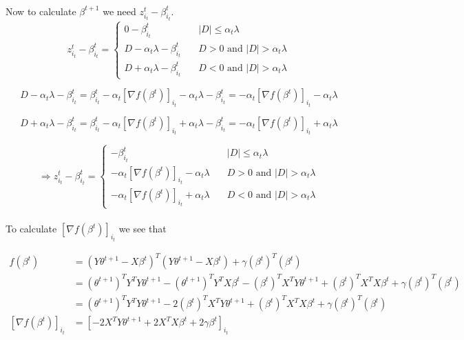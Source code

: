 \documentclass[12pt, reqno]{amsart}
\theoremstyle{definition}
\theoremstyle{remark}
\begin{document}
\hfill \\
Now to calculate $\beta^{t+1}$ we need $z_{i_t}^t - \beta_{i_t}^t$.\\

\begin{equation*}
z_{i_t}^t - \beta_{i_t}^t = \left\{
			\begin{array}{ll}
				0 - \beta_{i_t}^t  & \quad |D| \leq \alpha_t \lambda \\
				D - \alpha_t \lambda - \beta_{i_t}^t & \quad D > 0 
				\text{ and } |D| > \alpha_t \lambda \\
				D + \alpha_t \lambda - \beta_{i_t}^t & \quad D < 0 
				\text{ and } |D| > \alpha_t \lambda
			\end{array}
			\right.
\end{equation*}

\begin{equation*}
D - \alpha_t \lambda - \beta_{i_t}^t = \beta_{i_t}^t - \alpha_t [\nabla f(\beta^t)]_{i_t} - \alpha_t \lambda - \beta_{i_t}^t = -\alpha_t [\nabla f(\beta^t)]_{i_t} - \alpha_t \lambda
\end{equation*}

\begin{equation*}
D + \alpha_t \lambda - \beta_{i_t}^t = \beta_{i_t}^t - \alpha_t [\nabla f(\beta^t)]_{i_t} + \alpha_t \lambda - \beta_{i_t}^t = -\alpha_t [\nabla f(\beta^t)]_{i_t} + \alpha_t \lambda
\end{equation*}

\begin{equation*}
\Rightarrow z_{i_t}^t - \beta_{i_t}^t = \left\{
			\begin{array}{ll}
				- \beta_{i_t}^t  & \quad |D| \leq \alpha_t \lambda \\
				- \alpha_t [\nabla f(\beta^t)]_{i_t} - \alpha_t \lambda
				 & \quad D > 0 \text{ and } |D| > \alpha_t \lambda \\
				- \alpha_t [\nabla f(\beta^t)]_{i_t} + \alpha_t \lambda 
				& \quad D < 0 \text{ and } |D| > \alpha_t \lambda
			\end{array}
			\right.
\end{equation*}
\hfill \\
To calculate $[\nabla f(\beta^t)]_{i_t}$ we see that 

\begin{equation*}
\begin{split}
f(\beta^t) &= (Y \theta^{t+1} - X \beta^t)^T (Y \theta^{t+1} - X \beta^t) + \gamma(\beta^t)^T (\beta^t)\\
           &= (\theta^{t+1})^T Y^T Y \theta^{t+1} - (\theta^{t+1})^T Y^T X \beta^t - (\beta^t)^T X^T Y \theta^{t+1} + (\beta^t)^T X^T X \beta^t + \gamma(\beta^t)^T (\beta^t)\\
           &= (\theta^{t+1})^T Y^T Y \theta^{t+1} - 2(\beta^t)^T X^T Y \theta^{t+1} + (\beta^t)^T X^T X \beta^t + \gamma(\beta^t)^T (\beta^t)\\
[\nabla f(\beta^t)]_{i_t} &= [-2 X^T Y \theta^{t+1} + 2 X^T X \beta^t + 2 \gamma \beta^t]_{i_t}
\end{split}
\end{equation*}
\end{document}

